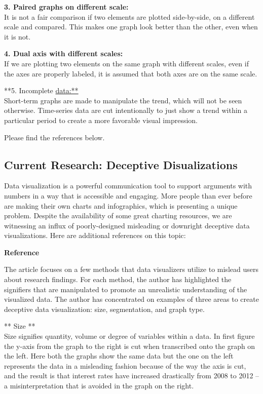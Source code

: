 \documentclass[]{book}
\theoremstyle{definition}
\theoremstyle{definition}
\theoremstyle{definition}
\theoremstyle{remark}
\begin{document}
\textbf{3. Paired graphs on different scale:}\\
It is not a fair comparison if two elements are plotted side-by-side, on
a different scale and compared. This makes one graph look better than
the other, even when it is not.

\textbf{4. Dual axis with different scales:}\\
If we are plotting two elements on the same graph with different scales,
even if the axes are properly labeled, it is assumed that both axes are
on the same scale.

**5. Incomplete \url{data:**}\\
Short-term graphs are made to manipulate the trend, which will not be
seen otherwise. Time-series data are cut intentionally to just show a
trend within a particular period to create a more favorable visual
impression.

Please find the references below. \citep{evil_axes}
\citep{mislead_graph_ex}

\subsection{Current Research: Deceptive
Disualizations}\label{current-research-deceptive-disualizations}

Data visualization is a powerful communication tool to support arguments
with numbers in a way that is accessible and engaging. More people than
ever before are making their own charts and infographics, which is
presenting a unique problem. Despite the availability of some great
charting resources, we are witnessing an influx of poorly-designed
misleading or downright deceptive data visualizations. Here are
additional references on this topic: \citep{decept_study}
\citep{rose_tint}

\textbf{Reference} \citep{visual-lies}

The article focuses on a few methods that data visualizers utilize to
mislead users about research findings. For each method, the author has
highlighted the signifiers that are manipulated to promote an
unrealistic understanding of the visualized data. The author has
concentrated on examples of three areas to create deceptive data
visualization: size, segmentation, and graph type.

** Size **\\
Size signifies quantity, volume or degree of variables within a data. In
first figure the y-axis from the graph to the right is cut when
transcribed onto the graph on the left. Here both the graphs show the
same data but the one on the left represents the data in a misleading
fashion because of the way the axis is cut, and the result is that
interest rates have increased drastically from 2008 to 2012 -- a
misinterpretation that is avoided in the graph on the right.
\end{document}
